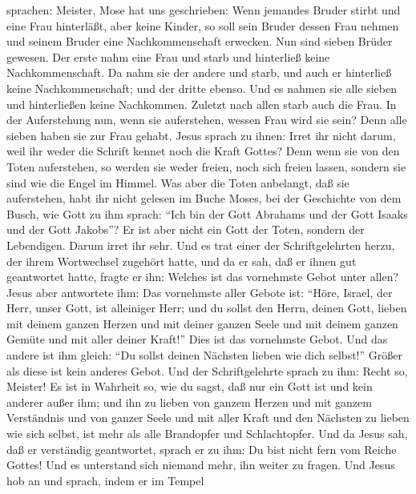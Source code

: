 sprachen:  Meister, Mose hat uns geschrieben: Wenn
jemandes Bruder stirbt und eine Frau hinterläßt, aber keine Kinder, so
soll sein Bruder dessen Frau nehmen und seinem Bruder eine
Nachkommenschaft erwecken.  Nun sind sieben Brüder
gewesen. Der erste nahm eine Frau und starb und hinterließ keine
Nachkommenschaft.  Da nahm sie der andere und starb, und
auch er hinterließ keine Nachkommenschaft; und der dritte ebenso.
 Und es nahmen sie alle sieben und hinterließen keine
Nachkommen. Zuletzt nach allen starb auch die Frau.  In
der Auferstehung nun, wenn sie auferstehen, wessen Frau wird sie sein?
Denn alle sieben haben sie zur Frau gehabt.  Jesus sprach
zu ihnen: Irret ihr nicht darum, weil ihr weder die Schrift kennet noch
die Kraft Gottes?  Denn wenn sie von den Toten
auferstehen, so werden sie weder freien, noch sich freien lassen,
sondern sie sind wie die Engel im Himmel.  Was aber die
Toten anbelangt, daß sie auferstehen, habt ihr nicht gelesen im Buche
Moses, bei der Geschichte von dem Busch, wie Gott zu ihm sprach: ``Ich
bin der Gott Abrahams und der Gott Isaaks und der Gott Jakobs''?
 Er ist aber nicht ein Gott der Toten, sondern der
Lebendigen. Darum irret ihr sehr.  Und es trat einer der
Schriftgelehrten herzu, der ihrem Wortwechsel zugehört hatte, und da er
sah, daß er ihnen gut geantwortet hatte, fragte er ihn: Welches ist das
vornehmste Gebot unter allen?  Jesus aber antwortete ihm:
Das vornehmste aller Gebote ist: ``Höre, Israel, der Herr, unser Gott,
ist alleiniger Herr;  und du sollst den Herrn, deinen
Gott, lieben mit deinem ganzen Herzen und mit deiner ganzen Seele und
mit deinem ganzen Gemüte und mit aller deiner Kraft!'' Dies ist das
vornehmste Gebot.  Und das andere ist ihm gleich: ``Du
sollst deinen Nächsten lieben wie dich selbst!'' Größer als diese ist
kein anderes Gebot.  Und der Schriftgelehrte sprach zu
ihm: Recht so, Meister! Es ist in Wahrheit so, wie du sagst, daß nur ein
Gott ist und kein anderer außer ihm;  und ihn zu lieben
von ganzem Herzen und mit ganzem Verständnis und von ganzer Seele und
mit aller Kraft und den Nächsten zu lieben wie sich selbst, ist mehr als
alle Brandopfer und Schlachtopfer.  Und da Jesus sah, daß
er verständig geantwortet, sprach er zu ihm: Du bist nicht fern vom
Reiche Gottes! Und es unterstand sich niemand mehr, ihn weiter zu
fragen.  Und Jesus hob an und sprach, indem er im Tempel
